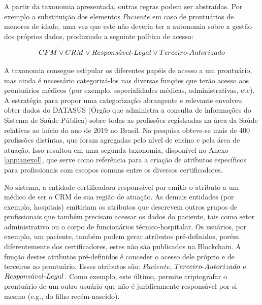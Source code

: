 \documentclass[a4paper,11pt]{article}
\begin{document}
A partir da taxonomia apresentada, outras regras podem ser abstraídas.
Por exemplo a substituição dos elementos $Paciente$ em caso de prontuários de menores de idade, uma vez que este não deveria ter a autonomia sobre a gestão dos próprios dados, produzindo a seguinte política de acesso:

\[ CFM \vee CRM \vee Respons\acute{a}vel\textnormal{-}Legal \vee Terceiro\textnormal{-}Autorizado \]

A taxonomia consegue estipular os diferentes papéis de acesso a um prontuário, mas ainda é necessário  categorizá-los nas diversas funções que terão acesso aos prontuários médicos (por exemplo, especialidades médicas, administrativas, etc).
A estratégia para propor uma categorização abrangente e relevante envolveu obter dados do DATASUS (Órgão que administra a consulta de informações do Sistema de Saúde Pública) sobre todas as profissões registradas na área da Saúde relativas ao início do ano de 2019 no Brasil.
Na pesquisa obteve-se mais de 400 profissões distintas, que foram agregadas pelo nível de ensino e pela área de atuação.
Isso resultou em uma segunda taxonomia, disponível no Anexo \ref{app:anexoI}, que serve como referência para a criação de atributos específicos para profissionais com escopos comuns entre os diversos certificadores. %

No sistema, a entidade certificadora responsável por emitir o atributo a um médico de ser o CRM de sua região de atuação. As demais entidades (por exemplo, hospitais) emitiriam os atributos que descrevem outros grupos de profissionais que também precisam acessar os dados do paciente, tais como setor administrativo ou o corpo de funcionários técnico-hospitalar.
Os usuários, por exemplo, um paciente, também podem gerar atributos pré-definidos, porém diferentemente dos certificadores, estes não são publicados na Blockchain.
A função destes atributos pré-definidos é conceder o acesso dele próprio e de terceiros ao prontuário. %
Esses atributos são: $Paciente$, $Terceiro\textnormal{-}Autorizado$ e $Respons\acute{a}vel\textnormal{-}Legal$. %
Como exemplo, este último, permite criptografar o prontuário de um outro usuário que não é juridicamente responsável por si mesmo (e.g., do filho recém-nascido).

\end{document}
